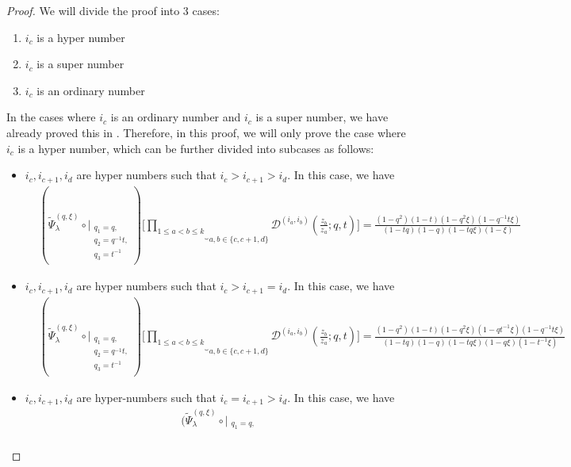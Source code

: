\documentclass[12pt,reqno,a4paper]{amsart}
\newcommand{\comp}{\circ}
\newcommand{\cals}[1]{\mathcal{#1}}
\numberwithin{equation}{section}
\newcommand{\dualmap}{
\widetilde{\Psi}^{(q,\xi)}_{\lambda}
}
\theoremstyle{definition}
\begin{document}
\begin{proof}
We will divide the proof into 3 cases: 
\begin{enumerate}
	\item $i_c$ is a hyper number
	\item $i_c$ is a super number
	\item $i_c$ is an ordinary number
\end{enumerate}
In the cases where $i_c$ is an ordinary number and $i_c$ is a super number, we have already proved this in \cite{CSW2025}. Therefore, in this proof, we will only prove the case where $i_c$ is a hyper number, which can be further divided into subcases as follows:
\begin{itemize}
	\item $i_c, i_{c+1}, i_d$ are hyper numbers such that $i_c > i_{c+1} > i_d$. In this case, we have 
	\footnotesize
	\begin{align}
		&(
		\dualmap
		\comp 
		\bigg|_{
			\substack{
				q_1 = q, \\
				q_2 = q^{-1}t,\\
				q_3 = t^{-1} \\
			}
		}
		)
		\Bigg[
		\underbrace{	\prod_{1 \leq a < b \leq k}				}_{a,b \in \{c,c+1,d\}}
		\cals{D}^{(i_a,i_b)}\left(
		\frac{z_b}{z_a}
		; q, t
		\right)
		\Bigg]
		= 
		\frac{
			(1 - q^2)(1 - t)(1 - q^2\xi)(1 - q^{-1}t\xi)
		}{
			(1 - tq)(1 - q)(1 - tq\xi)(1 - \xi)
		}
	\end{align}
	\normalsize
	\item $i_c, i_{c+1}, i_d$ are hyper numbers such that $i_c > i_{c+1} = i_d$. In this case, we have 
	\footnotesize
	\begin{align}
		&(
		\dualmap
		\comp 
		\bigg|_{
			\substack{
				q_1 = q, \\
				q_2 = q^{-1}t,\\
				q_3 = t^{-1} \\
			}
		}
		)
		\Bigg[
		\underbrace{	\prod_{1 \leq a < b \leq k}				}_{a,b \in \{c,c+1,d\}}
		\cals{D}^{(i_a,i_b)}\left(
		\frac{z_b}{z_a}
		; q, t
		\right)
		\Bigg]
		= 
		\frac{
			(1 - q^2)(1 - t)(1 - q^2\xi)(1 - qt^{-1}\xi)(1 - q^{-1}t\xi)
		}{
			(1 - tq)(1 - q)(1 - tq\xi)(1 - q\xi)(1 - t^{-1}\xi)
		}
	\end{align}
	\normalsize
	\item $i_c, i_{c+1}, i_d$ are hyper-numbers such that $i_c = i_{c+1} > i_d$. In this case, we have 
	\footnotesize
	\begin{align}
		&(
		\dualmap
		\comp 
		\bigg|_{
			\substack{
				q_1 = q, \\
}}
\end{align}
\end{itemize}
\end{proof}
\end{document}
